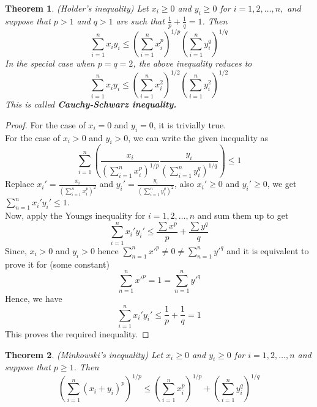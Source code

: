 \documentclass[12pt]{report}
\newtheorem{thm}{Theorem}
\begin{document}
\begin{thm}
    (Holder's inequality) Let $x_i \geq 0$ and $y_i \geq 0$ for $i = 1,2, \dots, n,$ and suppose that $p > 1$ and $q > 1$ are such that $\frac{1}{p} + \frac{1}{q} = 1$. Then
    $$ \sum\limits_{i=1}^n x_iy_i \leq \left(\sum\limits_{i=1}^nx_i^p\right)^{1/p} \left(\sum\limits_{i=1}^ny_i^q\right)^{1/q}$$
    In the special case when $p = q = 2$, the above inequality reduces to 
    $$ \sum\limits_{i=1}^n x_iy_i \leq \left(\sum\limits_{i=1}^nx_i^2\right)^{1/2} \left(\sum\limits_{i=1}^ny_i^2\right)^{1/2}$$
    This is called \textbf{Cauchy-Schwarz inequality.}
\end{thm}
\begin{proof}
    For the case of $x_i = 0$ and $y_i = 0$, it is trivially true.\\
    For the case of $x_i > 0$ and $y_i > 0$, we can write the given inequality as 
    $$ \sum\limits_{i = 1}^{n} \left(\frac{x_i}{\left(\sum\limits_{i = 1}^{n} x_i^p\right)^{1/p}} \frac{y_i}{\left(\sum\limits_{i = 1}^{n} y_i^q\right)^{1/q}} \right)\leq 1 $$
    Replace $ x_i' = \frac{x_i}{\left(\sum\limits_{i = 1}^{n} x_i^p\right)^2}$ and $y_i' = \frac{y_i}{\left(\sum\limits_{i = 1}^{n} y_i^q\right)^2} $, also $x_i' \geq 0$ and $y_i' \geq 0$, we get $ \sum\limits_{n = 1}^{n} x_i'y_i' \leq 1$. \\
    Now,  apply the Youngs inequality for $i = 1, 2, \dots, n$ and sum them up to get
    $$ \sum\limits_{i = 1}^{n} x_i'y_i' \leq \frac{\sum x^p}{p} + \frac{\sum y^q}{q}$$
    Since, $x_i > 0$ and $y_i > 0$ hence $\sum\limits_{n=1}^{n}x'^p \neq 0 \neq \sum\limits_{n=1}^{n}y'^q $ and it is equivalent to prove it for (some constant)
    $$ \sum\limits_{n=1}^{n}x'^p = 1 = \sum\limits_{n=1}^{n}y'^q $$
    Hence, we have
    $$ \sum\limits_{i = 1}^{n} x_i'y_i' \leq \frac{1}{p} + \frac{1}{q} = 1$$
    This proves the required inequality.
\end{proof}
\begin{thm}
    (Minkowski's inequality) Let $x_i \geq 0$ and $y_i \geq 0$ for $ i = 1,2,\dots, n$ and suppose that $p \geq 1$. Then
    $$ \left(\sum\limits_{i =1}^n(x_i + y_i)^p\right)^{1/p} \leq \left(\sum\limits_{i =1}^nx_i^p\right)^{1/p} + \left(\sum\limits_{i =1}^ny_i^q\right)^{1/q}$$  
\end{thm}
\end{document}

